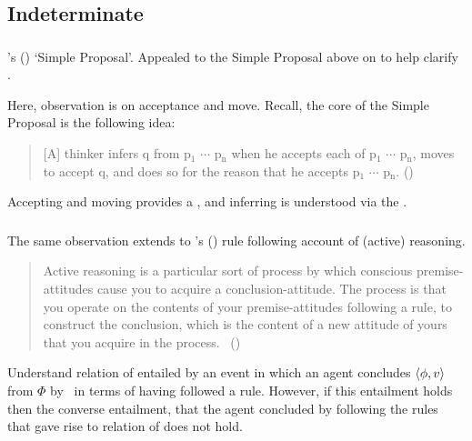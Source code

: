 \subsection{Indeterminate}
\label{sec:indeterminate}

\subsubsection{\textcite{Wright:2014tt}}

\begin{note}
  \citeauthor{Wright:2014tt}'s (\citeyear{Wright:2014tt}) `Simple Proposal'.
  Appealed to the Simple Proposal above on  to help clarify \supportI{}.

  Here, observation is on acceptance and move.
  Recall, the core of the Simple Proposal is the following idea:

  \begin{quote}
    [A] thinker infers q from p\(_{1}\) \(\cdots\) p\(_{\text{n}}\) when he accepts each of p\(_{1}\) \(\cdots\) p\(_{\text{n}}\), moves to accept q, and does so for the reason that he accepts p\(_{1}\) \(\cdots\) p\(_{\text{n}}\).%
    \mbox{}\hfill\mbox{(\citeyear[33]{Wright:2014tt})}
  \end{quote}

  Accepting and moving provides a \wit{}, and inferring is understood via the \wit{}.
\end{note}

\subsubsection{\textcite{Broome:2002aa}}

\begin{note}
  The same observation extends to \citeauthor{Broome:2002aa}'s (\citeyear{Broome:2013aa}) rule following account of (active) reasoning.

  \begin{quote}
    Active reasoning is a particular sort of process by which conscious premise-attitudes cause you to acquire a conclusion-attitude.
    The process is that you operate on the contents of your premise-attitudes following a rule, to construct the conclusion, which is the content of a new attitude of yours that you acquire in the process.\newline
    \mbox{ }\hfill\mbox{(\citeyear[234]{Broome:2002aa})}
  \end{quote}

  Understand relation of \support{} entailed by an event in which an agent concludes \(\langle \phi, v \rangle\) from \(\Phi\) by~\supportI{} in terms of having followed a rule.
  However, if this entailment holds then the converse entailment, that the agent concluded by following the rules that gave rise to relation of \support{} does not hold.
\end{note}

